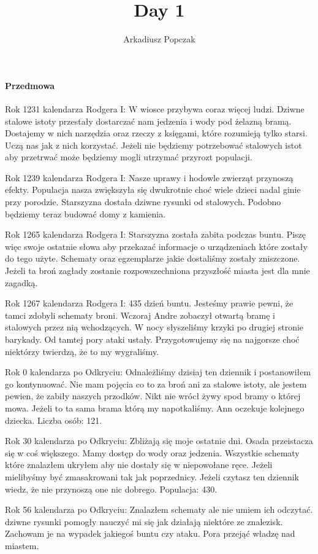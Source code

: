 \documentclass{article}
\title{\Huge{Day 1}}
\author{Arkadiusz Popczak}
\newcommand{\paragraphx}[1]{
        \paragraph{\Large{{#1}}}\mbox{}

    }
\begin{document}
    \maketitle

    \paragraphx{Przedmowa}
    Rok 1231 kalendarza Rodgera I: W wiosce przybywa coraz więcej ludzi. Dziwne stalowe istoty przestały dostarczać nam jedzenia i wody pod żelazną bramą. Dostajemy w nich narzędzia oraz rzeczy z księgami, które rozumieją tylko starsi. Uczą nas jak z nich korzystać. Jeżeli nie będziemy potrzebować stalowych istot aby przetrwać może będziemy mogli utrzymać przyrozt populacji.

    Rok 1239 kalendarza Rodgera I: Nasze uprawy i hodowle zwierząt przynoszą efekty. Populacja nasza zwiększyła się dwukrotnie choć wiele dzieci nadal ginie przy porodzie. Starszyzna dostała dziwne rysunki od stalowych. Podobno będziemy teraz budować domy z kamienia.

    Rok 1265 kalendarza Rodgera I: Starszyzna została zabita podczas buntu. Piszę więc swoje ostatnie słowa aby przekazać informacje o urządzeniach które zostały do tego użyte. Schematy oraz egzemplarze jakie dostaliśmy zostały zniszczone. Jeżeli ta broń zagłady zostanie rozpowszechniona przyszłość miasta jest dla mnie zagadką.

    Rok 1267 kalendarza Rodgera I: 435 dzień buntu. Jesteśmy prawie pewni, że tamci zdobyli schematy broni. Wczoraj Andre zobaczył otwartą bramę i stalowych przez nią wchodzących. W nocy słyszeliśmy krzyki po drugiej stronie barykady. Od tamtej pory ataki ustały. Przygotowujemy się na najgorsze choć niektórzy twierdzą, że to my wygraliśmy.

    Rok 0 kalendarza po Odkryciu: Odnależliśmy dzisiaj ten dziennik i postanowiłem go kontynuować. Nie mam pojęcia co to za broń ani za stalowe istoty, ale jestem pewien, że zabiły naszych przodków. Nikt nie wrócł żywy spod bramy o której mowa. Jeżeli to ta sama brama którą my napotkaliśmy. Ann oczekuje kolejnego dziecka. Liczba osób: 121.

    Rok 30 kalendarza po Odkryciu: Zbliżają się moje ostatnie dni. Osada przeistacza się w coś większego. Mamy dostęp do wody oraz jedzenia. Wszystkie schematy które znalazłem ukryłem aby nie dostały się w niepowołane ręce. Jeżeli mielibyśmy być zmasakrowani tak jak poprzednicy. Jeżeli czytasz ten dziennik wiedz, że nie przynoszą one nic dobrego. Populacja: 430.

    Rok 56 kalendarza po Odkryciu: Znalazłem schematy ale nie umiem ich odczytać. dziwne rysunki pomogły nauczyć mi się jak działają niektóre ze znalezisk. Zachowam je na wypadek jakiegoś buntu czy ataku. Pora przejąć władzę nad miastem.
\end{document}
